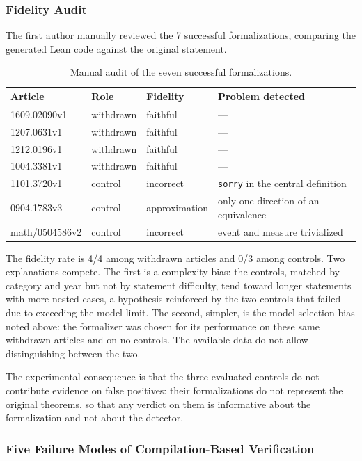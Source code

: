 \documentclass{article}
\theoremstyle{remark}
\begin{document}
\subsubsection{Fidelity Audit}

The first author manually reviewed the 7 successful formalizations, comparing the generated Lean code against the original statement.

\begin{table}[htbp]
\centering
\small
\begin{tabular}{llll}
\toprule
Article & Role & Fidelity & Problem detected \\
\midrule
1609.02090v1   & withdrawn & faithful & --- \\
1207.0631v1    & withdrawn & faithful & --- \\
1212.0196v1    & withdrawn & faithful & --- \\
1004.3381v1    & withdrawn & faithful & --- \\
1101.3720v1    & control  & incorrect & \texttt{sorry} in the central definition \\
0904.1783v3    & control  & approximation & only one direction of an equivalence \\
math/0504586v2 & control  & incorrect & event and measure trivialized \\
\bottomrule
\end{tabular}
\caption{Manual audit of the seven successful formalizations.}
\label{tab:fidelidad}
\end{table}

The fidelity rate is 4/4 among withdrawn articles and 0/3 among controls. Two explanations compete. The first is a complexity bias: the controls, matched by category and year but not by statement difficulty, tend toward longer statements with more nested cases, a hypothesis reinforced by the two controls that failed due to exceeding the model limit. The second, simpler, is the model selection bias noted above: the formalizer was chosen for its performance on these same withdrawn articles and on no controls. The available data do not allow distinguishing between the two.

The experimental consequence is that the three evaluated controls do not contribute evidence on false positives: their formalizations do not represent the original theorems, so that any verdict on them is informative about the formalization and not about the detector.

\subsubsection{Five Failure Modes of Compilation-Based Verification}
\label{ssec:modosfalla}
\end{document}
